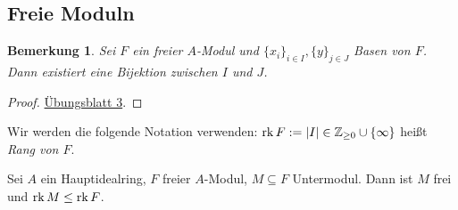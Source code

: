 \documentclass[12pt,a4paper]{scrartcl}
\theoremstyle{cplain}
\theoremstyle{cdef}
\newtheorem{beme}[thmcounter]{Bemerkung}
\begin{document}
\subsection{Freie Moduln}
\begin{beme}
	Sei $F$ ein freier $A$-Modul und $\{x_i\}_{i\in I}, \{y\}_{j\in J}$ Basen von $F$. Dann existiert eine Bijektion zwischen $I$ und $J$.
\end{beme}
\begin{proof}
	\href{http://www.math.uni-bonn.de/ag/stroppel/Franzen_Algebra_1_Uebung/Blatt3.pdf}{Übungsblatt 3}.
\end{proof}

Wir werden die folgende Notation verwenden: $\operatorname{rk} F := \lvert I\rvert \in\mathbb Z_{\ge 0}\cup \{\infty\}$ heißt \emph{Rang von $F$}.

\begin{satz} \label{thm:untermoduln freier moduln in hir}
	Sei $A$ ein Hauptidealring, $F$ freier $A$-Modul, $M\subseteq F$ Untermodul. Dann ist $M$ frei und $\operatorname{rk} M\le \operatorname{rk} F$.
\end{satz}
\end{document}
